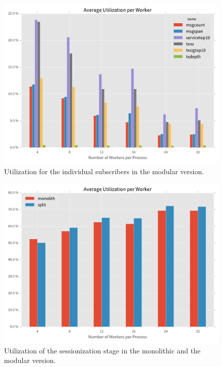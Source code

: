 \begin{figure}[p]
  \centering
    \includegraphics[width=1\textwidth]{figures/evaluation/subsutil}
    \caption[Subscriber worker utilization]{Utilization for the individual
    subscribers in the modular version.}
    \label{fig:subutil}
\end{figure}

\begin{figure}[p]
  \centering
    \includegraphics[width=1\textwidth]{figures/evaluation/sessutil}
    \caption[Sessionization worker utilization]{Utilization of the sessionization stage
    in the monolithic and the modular version.}
    \label{fig:sessutil}
\end{figure}
\clearpage
